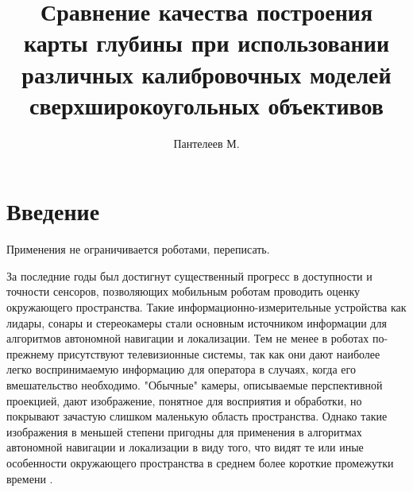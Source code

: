 

\raggedbottom
%


\title{Сравнение качества построения карты глубины при использовании различных калибровочных моделей сверхширокоугольных объективов}
\author{Пантелеев М.}
\maketitle

\begin{abstract}

\end{abstract}

\section{Введение}

Применения не ограничивается роботами, переписать.

За последние годы был достигнут существенный прогресс в доступности и точности сенсоров, позволяющих мобильным роботам 
проводить оценку окружающего пространства. Такие информационно-измерительные устройства как лидары, сонары и стереокамеры
 стали основным источником информации для алгоритмов автономной навигации и локализации. Тем не менее в роботах по-прежнему 
присутствуют телевизионные системы, так как они дают наиболее легко воспринимаемую информацию для оператора в случаях, когда 
его вмешательство необходимо. "Обычные" камеры, описываемые перспективной проекцией, дают изображение, понятное для 
восприятия и обработки, но покрывают зачастую слишком маленькую область пространства. Однако такие изображения в меньшей степени 
пригодны для применения в алгоритмах автономной навигации и локализации в виду того, что видят те или иные особенности окружающего
пространства в среднем более короткие промежутки времени \cite{stereo_slam}. 

